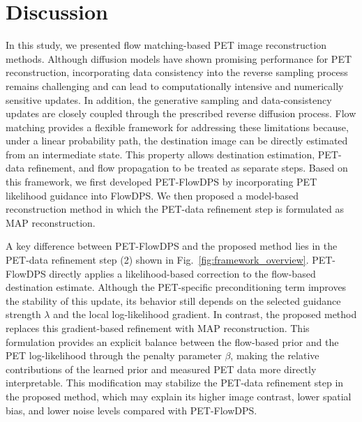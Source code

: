 \documentclass[journal]{IEEEtran}
\begin{document}
\section{Discussion}
In this study, we presented flow matching-based PET image reconstruction methods. Although diffusion models have shown promising performance for PET reconstruction, incorporating data consistency into the reverse sampling process remains challenging and can lead to computationally intensive and numerically sensitive updates. In addition, the generative sampling and data-consistency updates are closely coupled through the prescribed reverse diffusion process. Flow matching provides a flexible framework for addressing these limitations because, under a linear probability path, the destination image can be directly estimated from an intermediate state. This property allows destination estimation, PET-data refinement, and flow propagation to be treated as separate steps. Based on this framework, we first developed PET-FlowDPS by incorporating PET likelihood guidance into FlowDPS. We then proposed a model-based reconstruction method in which the PET-data refinement step is formulated as MAP reconstruction.

A key difference between PET-FlowDPS and the proposed method lies in the PET-data refinement step (2) shown in Fig.~\ref{fig:framework_overview}. PET-FlowDPS directly applies a likelihood-based correction to the flow-based destination estimate. Although the PET-specific preconditioning term improves the stability of this update, its behavior still depends on the selected guidance strength $\lambda$ and the local log-likelihood gradient. In contrast, the proposed method replaces this gradient-based refinement with MAP reconstruction. This formulation provides an explicit balance between the flow-based prior and the PET log-likelihood through the penalty parameter $\beta$, making the relative contributions of the learned prior and measured PET data more directly interpretable. This modification may stabilize the PET-data refinement step in the proposed method, which may explain its higher image contrast, lower spatial bias, and lower noise levels compared with PET-FlowDPS.
\end{document}
